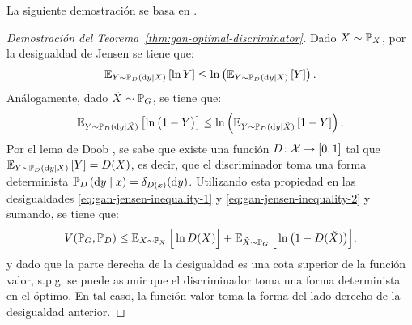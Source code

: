 {{La siguiente demostración se basa en \cite{wikipediagan}.

\begin{proof}[Demostración del Teorema~\ref{thm:gan-optimal-discriminator}]
    Dado $X \sim \Prob_X$, por la desigualdad de Jensen se tiene que:
    \begin{equation}\label{eq:gan-jensen-inequality-1}
        \Exp_{Y \sim \Prob_D \left( \dd y \mid X \right)} \left[ \ln Y \right]
        \leq \ln \left( \Exp_{Y \sim \Prob_D \left( \dd y \mid X \right)} \left[ Y \right] \right).
    \end{equation}
    Análogamente, dado $\tilde X \sim \Prob_G$, se tiene que:
    \begin{equation}\label{eq:gan-jensen-inequality-2}
        \Exp_{Y \sim \Prob_D ( \dd y \mid \tilde X )} \left[ \ln \qty\big(1 - Y) \right]
        \leq \ln \left( \Exp_{Y \sim \Prob_D ( \dd y \mid \tilde X )} \left[ 1 - Y \right] \right).
    \end{equation}
    Por el lema de Doob \cite[ver Cor. 9.4.11]{sanmartin2018teoria}, se sabe que existe una función $D \colon \mathcal{X} \to [0, 1]$ tal que $\Exp_{Y \sim \Prob_D \left( \dd y \mid X \right)} \left[ Y \right]
        = D(X)$,
    es decir, que el discriminador toma una forma determinista $\Prob_D \left( \dd y \mid x \right) = \delta_{D(x)}(\dd y)$. Utilizando esta propiedad en las desigualdades \eqref{eq:gan-jensen-inequality-1} y \eqref{eq:gan-jensen-inequality-2} y sumando, se tiene que:
    \begin{equation}
        V(\Prob_G, \Prob_D) \leq \Exp_{X \sim \Prob_X} \Big[ \ln D(X) \Big] + \Exp_{\tilde X \sim \Prob_G} \Big[ \ln \qty\big(1 - D(\tilde X)) \Big],
    \end{equation}
    y dado que la parte derecha de la desigualdad es una cota superior de la función valor, s.p.g. se puede asumir que el discriminador toma una forma determinista en el óptimo. En tal caso, la función valor toma la forma del lado derecho de la desigualdad anterior.


\end{proof}}}
